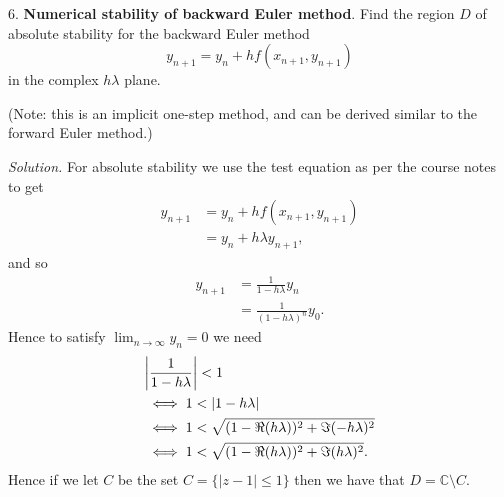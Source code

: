 \documentclass{article}
\newcommand{\C}{\mathbb{C}}
\begin{document}
\newpage

6. \textbf{Numerical stability of backward Euler method}.
Find the region $D$ of absolute stability for the backward Euler method
%
\begin{equation*}
    y_{n + 1} = y_n + h f(x_{n + 1}, y_{n + 1})
\end{equation*}
%
in the complex $h \lambda$ plane.

(Note: this is an implicit one-step method, and can be derived similar to the forward Euler method.)

\textit{Solution.}
For absolute stability we use the test equation as per the course notes to get
%
\begin{align*}
    y_{n + 1}
        &= y_n + h f(x_{n + 1}, y_{n + 1}) \\
        &= y_n + h \lambda y_{n + 1},
\end{align*}
%
and so
%
\begin{align*}
    y_{n + 1}
        &= \frac{1}{1 - h \lambda} y_n \\
        &= \frac{1}{(1 - h \lambda)^n} y_0.
\end{align*}
%
Hence to satisfy $\lim_{n \to \infty} y_n = 0$ we need
%
\begin{align*}
    &\envert{\frac{1}{1 - h \lambda}} < 1
    \\
    &\iff 1 < |1 - h \lambda|
    \\
    &\iff 1 < \sqrt{(1 - \Re(h \lambda))^2 + \Im(- h \lambda)^2}
    \\
    &\iff 1 < \sqrt{(1 - \Re(h \lambda))^2 + \Im(h \lambda)^2}
    .
\end{align*}
%
Hence if we let $C$ be the set $C = \{|z - 1| \leq 1\}$ then we have that $D = \C \setminus C$.

\newpage
\end{document}

